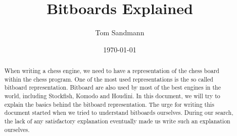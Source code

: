 \documentclass[hidelinks, english]{article}
\title{Bitboards Explained}
\author{
    Tom Sandmann
}
\date{\today}
\begin{document}
\maketitle

\begin{abstract}
	When writing a chess engine, we need to have a representation of the chess board within the chess program.
	One of the most used representations is the so called bitboard representation. 
	Bitboard are also used by most of the best engines in the world, including Stockfish, Komodo and Houdini. 
	In this document, we will try to explain the basics behind the bitboard representation. 
	The urge for writing this document started when we tried to understand bitboards ourselves.
	During our search, the lack of any satisfactory explanation eventually made us write such an explanation ourselves.
\end{abstract}

\tableofcontents








 
\end{document}
